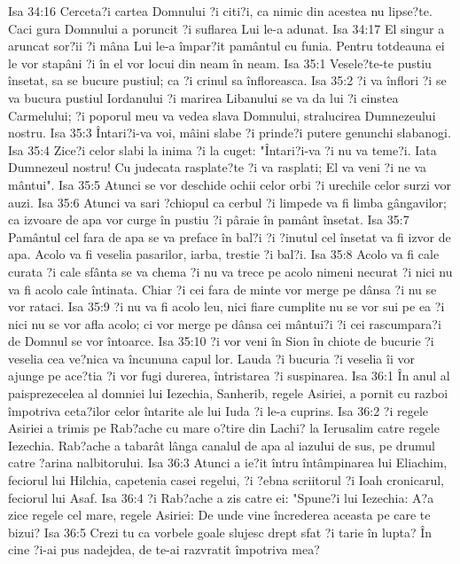 Isa 34:16  Cerceta?i cartea Domnului ?i citi?i, ca nimic din acestea nu lipse?te. Caci gura Domnului a poruncit ?i suflarea Lui le-a adunat.
Isa 34:17  El singur a aruncat sor?ii ?i mâna Lui le-a împar?it pamântul cu funia. Pentru totdeauna ei le vor stapâni ?i în el vor locui din neam în neam.
Isa 35:1  Vesele?te-te pustiu însetat, sa se bucure pustiul; ca ?i crinul sa înfloreasca.
Isa 35:2  ?i va înflori ?i se va bucura pustiul Iordanului ?i marirea Libanului se va da lui ?i cinstea Carmelului; ?i poporul meu va vedea slava Domnului, stralucirea Dumnezeului nostru.
Isa 35:3  Întari?i-va voi, mâini slabe ?i prinde?i putere genunchi slabanogi.
Isa 35:4  Zice?i celor slabi la inima ?i la cuget: "Întari?i-va ?i nu va teme?i. Iata Dumnezeul nostru! Cu judecata rasplate?te ?i va rasplati; El va veni ?i ne va mântui".
Isa 35:5  Atunci se vor deschide ochii celor orbi ?i urechile celor surzi vor auzi.
Isa 35:6  Atunci va sari ?chiopul ca cerbul ?i limpede va fi limba gângavilor; ca izvoare de apa vor curge în pustiu ?i pâraie în pamânt însetat.
Isa 35:7  Pamântul cel fara de apa se va preface în bal?i ?i ?inutul cel însetat va fi izvor de apa. Acolo va fi veselia pasarilor, iarba, trestie ?i bal?i.
Isa 35:8  Acolo va fi cale curata ?i cale sfânta se va chema ?i nu va trece pe acolo nimeni necurat ?i nici nu va fi acolo cale întinata. Chiar ?i cei fara de minte vor merge pe dânsa ?i nu se vor rataci.
Isa 35:9  ?i nu va fi acolo leu, nici fiare cumplite nu se vor sui pe ea ?i nici nu se vor afla acolo; ci vor merge pe dânsa cei mântui?i ?i cei rascumpara?i de Domnul se vor întoarce.
Isa 35:10  ?i vor veni în Sion în chiote de bucurie ?i veselia cea ve?nica va încununa capul lor. Lauda ?i bucuria ?i veselia îi vor ajunge pe ace?tia ?i vor fugi durerea, întristarea ?i suspinarea.
Isa 36:1  În anul al paisprezecelea al domniei lui Iezechia, Sanherib, regele Asiriei, a pornit cu razboi împotriva ceta?ilor celor întarite ale lui Iuda ?i le-a cuprins.
Isa 36:2  ?i regele Asiriei a trimis pe Rab?ache cu mare o?tire din Lachi? la Ierusalim catre regele Iezechia. Rab?ache a tabarât lânga canalul de apa al iazului de sus, pe drumul catre ?arina nalbitorului.
Isa 36:3  Atunci a ie?it întru întâmpinarea lui Eliachim, feciorul lui Hilchia, capetenia casei regelui, ?i ?ebna scriitorul ?i Ioah cronicarul, feciorul lui Asaf.
Isa 36:4  ?i Rab?ache a zis catre ei: "Spune?i lui Iezechia: A?a zice regele cel mare, regele Asiriei: De unde vine încrederea aceasta pe care te bizui?
Isa 36:5  Crezi tu ca vorbele goale slujesc drept sfat ?i tarie în lupta? În cine ?i-ai pus nadejdea, de te-ai razvratit împotriva mea?
